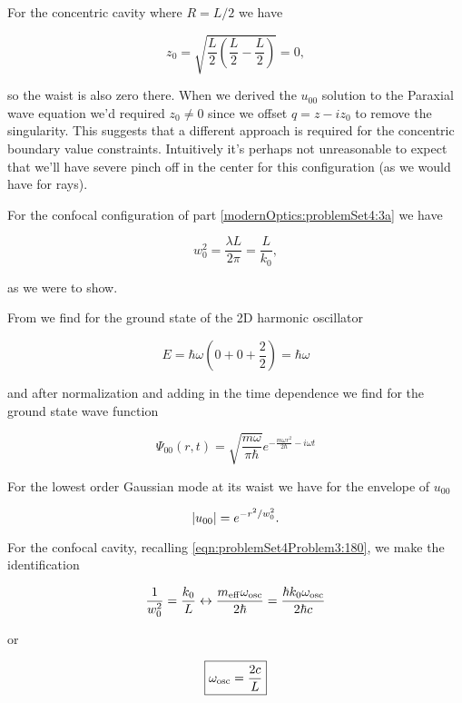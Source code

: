 {For the concentric cavity where $R = L/2$ we have

\begin{equation}\label{eqn:problemSet4Problem3:160}
z_0 = \sqrt{\frac{L}{2} \left( \frac{L}{2} - \frac{L}{2}\right)} = 0,
\end{equation}

so the waist is also zero there.  When we derived the $u_{00}$ solution to the Paraxial wave equation we'd required $z_0 \ne 0$ since we offset $q = z - i z_0$ to remove the singularity.  This suggests that a different approach is required for the concentric boundary value constraints.  Intuitively it's perhaps not unreasonable to expect that we'll have severe pinch off in the center for this configuration (as we would have for rays).

For the confocal configuration of part \ref{modernOptics:problemSet4:3a} we have

\begin{equation}\label{eqn:problemSet4Problem3:180}
w_0^2 = \frac{\lambda L}{2 \pi} = \frac{L}{k_0},
\end{equation}

as we were to show.


From \citep{bohm1989qt} we find for the ground state of the 2D harmonic oscillator

\begin{equation}\label{eqn:problemSet4Problem3:200}
E = \hbar \omega \left( 0 + 0 + \frac{2}{2} \right) = \hbar \omega
\end{equation}

and after normalization and adding in the time dependence we find for the ground state wave function

\begin{equation}\label{eqn:problemSet4Problem3:220}
\Psi_{00}(r, t) = \sqrt{\frac{m \omega}{\pi \hbar}} e^{ -\frac{m \omega r^2}{2 \hbar} - i \omega t}
\end{equation}

For the lowest order Gaussian mode at its waist we have for the envelope of $u_{00}$

\begin{equation}\label{eqn:problemSet4Problem3:240}
{\left\lvert{u_{00}}\right\rvert} = e^{-r^2/w_0^2}.
\end{equation}

For the confocal cavity, recalling \ref{eqn:problemSet4Problem3:180}, we make the identification

\begin{dmath}\label{eqn:problemSet4Problem3:260}
\inv{w_0^2}
=
\frac{k_0}{L}
\leftrightarrow \frac{m_{\mathrm{eff}} \omega_{\mathrm{osc}}}{2 \hbar}
=
\frac{\hbar k_0 \omega_{\mathrm{osc}}}{2 \hbar c}
\end{dmath}

or

\begin{equation}\label{eqn:problemSet4Problem3:280}
\boxed{
\omega_{\mathrm{osc}} = \frac{2 c}{L}
}
\end{equation}

}

